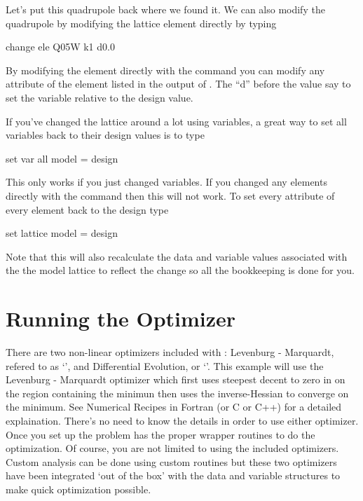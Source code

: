 Let's put this quadrupole back where we found it. We can also modify the quadrupole
by modifying the lattice element directly by typing
\begin{example}
  change ele Q05W k1 d0.0
\end{example}
By modifying the element directly with the  command you can
modify any attribute of the element listed in the output of .
The ``d'' before the value say to set the variable relative to the design value.

If you've changed the lattice around a lot using variables, a great way to set
all variables back to their design values is to type
\begin{example}
  set var all model = design
\end{example}
This only works if you just changed variables. If you changed any elements
directly with the  command then this will not work. To set
every attribute of every element back to the design type
\begin{example}
  set lattice model = design
\end{example}
Note that this will also recalculate the data and variable values associated with the
the model lattice to reflect the change so all the bookkeeping is done for you.


\section{Running the Optimizer}
\label{s:optimizer}

There are two non-linear optimizers included with \tao: Levenburg - Marquardt,
refered to as `', and Differential Evolution, or `'. This example
will use the Levenburg - Marquardt optimizer which first uses steepest decent to
zero in on the region containing the minimun then uses the inverse-Hessian to
converge on the minimum. See Numerical Recipes in Fortran (or C or C++) for a
detailed explaination. There's no need to know the details in order to use
either optimizer. Once you set up the problem \tao has the proper wrapper
routines to do the optimization. Of course, you are not limited to using the
included optimizers. Custom analysis can be done using custom routines but these
two optimizers have been integrated `out of the box' with the \tao data and
variable structures to make quick optimization possible.

